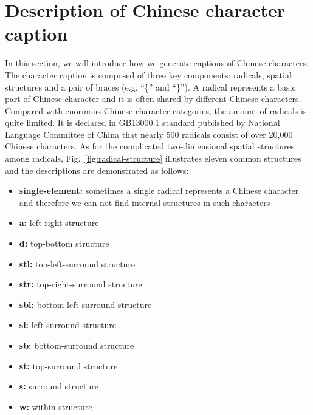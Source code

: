 \documentclass[a4paper,conference]{IEEEtran}
\begin{document}


\section{Description of Chinese character caption}
\label{sec:Description of Chinese character caption}
In this section, we will introduce how we generate captions of Chinese characters. The character caption is composed of three key components: radicals, spatial structures and a pair of braces (e.g. ``\{'' and ``\}''). A radical represents a basic part of Chinese character and it is often shared by different Chinese characters. Compared with enormous Chinese character categories, the amount of radicals is quite limited. It is declared in GB13000.1 standard published by National Language Committee of China that nearly 500 radicals consist of over 20,000 Chinese characters. As for the complicated two-dimensional spatial structures among radicals, Fig.~\ref{fig:radical-structure} illustrates eleven common structures and the descriptions are demonstrated as follows:
\begin{itemize}
  \item \textbf{single-element:} sometimes a single radical represents a Chinese character and therefore we can not find internal structures in such characters
  \item \textbf{a:} left-right structure
  \item \textbf{d:} top-bottom structure
  \item \textbf{stl:} top-left-surround structure
  \item \textbf{str:} top-right-surround structure
  \item \textbf{sbl:} bottom-left-surround structure
  \item \textbf{sl:} left-surround structure
  \item \textbf{sb:} bottom-surround structure
  \item \textbf{st:} top-surround structure
  \item \textbf{s:} surround structure
  \item \textbf{w:} within structure
\end{itemize}
\end{document}
